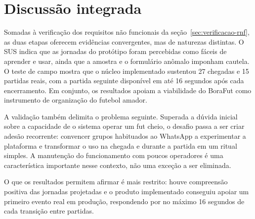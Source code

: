 \section{Discussão integrada}

    Somadas à verificação dos requisitos não funcionais da seção~\ref{sec:verificacao-rnf}, as duas etapas oferecem evidências convergentes, mas de naturezas distintas. O SUS indica que as jornadas do protótipo foram percebidas como fáceis de aprender e usar, ainda que a amostra e o formulário anômalo imponham cautela. O teste de campo mostra que o núcleo implementado sustentou 27 chegadas e 15 partidas reais, com a partida seguinte disponível em até 16 segundos após cada encerramento. Em conjunto, os resultados apoiam a viabilidade do BoraFut como instrumento de organização do futebol amador.

    A validação também delimita o problema seguinte. Superada a dúvida inicial sobre a capacidade de o sistema operar um fut cheio, o desafio passa a ser criar adesão recorrente: convencer grupos habituados ao WhatsApp a experimentar a plataforma e transformar o uso na chegada e durante a partida em um ritual simples. A manutenção do funcionamento com poucos operadores é uma característica importante nesse contexto, não uma exceção a ser eliminada.

    O que os resultados permitem afirmar é mais restrito: houve compreensão positiva das jornadas projetadas e o produto implementado conseguiu apoiar um primeiro evento real em produção, respondendo por no máximo 16 segundos de cada transição entre partidas.
